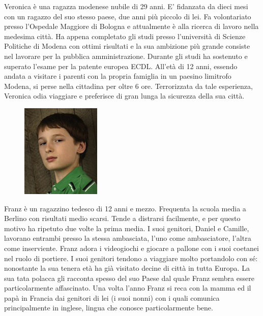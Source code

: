 \documentclass[12pt,a4paper,openright, notitlepage]{report}
\begin{document}
Veronica è una ragazza modenese nubile di 29 anni. E’ fidanzata da dieci mesi con un ragazzo del suo stesso paese, due anni più piccolo di lei. Fa volontariato presso l’Ospedale Maggiore di Bologna e attualmente è alla ricerca di lavoro nella medesima città. Ha appena completato gli studi presso l’università di Scienze Politiche di Modena con ottimi risultati e la sua ambizione più grande consiste nel lavorare per la pubblica amministrazione. Durante gli studi ha sostenuto e superato l’esame per la patente europea ECDL. All’età di 12 anni, essendo andata a visitare i parenti con la propria famiglia in un paesino limitrofo Modena, si perse nella cittadina per oltre 6 ore. Terrorizzata da tale esperienza, Veronica odia viaggiare e preferisce di gran lunga la sicurezza della sua città.

\begin{figure}
  \vspace{-30pt}
  \begin{center}
    \includegraphics{imgs/franz.jpg}
  \end{center}
  \vspace{-30pt}
\end{figure}

Franz è un ragazzino tedesco di 12 anni e mezzo. Frequenta la scuola media a Berlino con risultati medio scarsi. Tende a distrarsi facilmente, e per questo motivo ha ripetuto due volte la prima media. I suoi genitori, Daniel e Camille, lavorano entrambi presso la stessa ambasciata, l’uno come ambasciatore, l’altra come inserviente. Franz adora i videogiochi e giocare a pallone con i suoi coetanei nel ruolo di portiere. I suoi genitori tendono a viaggiare molto portandolo con sé: nonostante la sua tenera età ha già visitato decine di città in tutta Europa. La sua tata polacca gli racconta spesso del suo Paese dal quale Franz sembra essere particolarmente affascinato. Una volta l’anno Franz si reca con la mamma ed il papà in Francia dai genitori di lei (i suoi nonni) con i quali comunica principalmente in inglese, lingua che conosce particolarmente bene.
\end{document}
